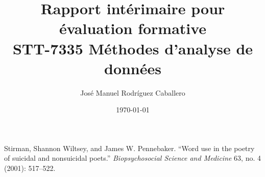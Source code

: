 \documentclass[12pt,a4paper]{article}
\title{\textbf{Rapport intérimaire pour évaluation formative}\\
	\vspace{0.5em}
	\large{STT-7335 Méthodes d'analyse de données}}
\author{José Manuel Rodríguez Caballero}
\date{\today}
\begin{document}
\maketitle








\small
\begin{thebibliography}{1}
	
	Stirman, Shannon Wiltsey, and James W. Pennebaker. 
	``Word use in the poetry of suicidal and nonsuicidal poets.'' 
	\emph{Biopsychosocial Science and Medicine} 63, no. 4 (2001): 517--522.
	
\end{thebibliography}

	
\end{document}
